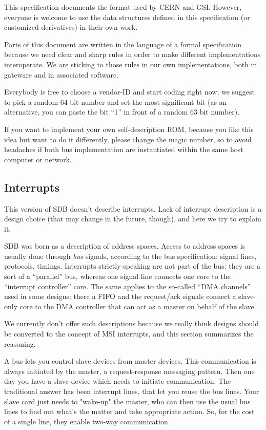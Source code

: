 \documentclass[a4paper, 12pt]{article}
\begin{document}
This specification documents the format used by CERN and GSI. However,
everyone is welcome to use the data structures defined in this
specification (or customized derivatives) in their own work.

Parts of this document are written in the language of
a formal specification because we need clear and sharp rules in
order to make different implementations interoperate.  We are sticking
to those rules in our own implementations, both in gateware and in
associated software.

Everybody is free to choose a vendor-ID and start coding right now; we
suggest to pick a random 64 bit number and set the most significant
bit (as an alternative, you can paste the bit ``1'' in front of
a random 63 bit number).

If you want to implement your own self-description ROM, because you like
this idea but want to do it differently, please change the magic number, so to avoid
headaches if both bus implementation are instantiated within the same host
computer or network.


\subsection{Interrupts}

This version of SDB doesn't describe interrupts.  Lack of interrupt
description is a design choice (that may change in the future,
though), and here we try to explain it.

SDB was born as a description of address spaces. Access to address
spaces is usually done through \textit{bus} signals, according to the
bus specification: signal lines, protocols, timings.  Interrupts
strictly-speaking are not part of the bus: they are a sort of a
``parallel'' bus, whereas one signal line connects one core to the
``interrupt controller'' core.  The same applies to the so-called
``DMA channels'' used in some designs: there a FIFO and the
request/ack signals connect a slave-only core to the DMA controller
that can act as a master on behalf of the slave.

We currently don't offer such descriptions because we really think
designs should be converted to the concept of MSI interrupts, and
this section summarizes the reasoning.


A bus lets you control slave
devices from master devices. This communication is always initiated by
the master, a request-response messaging pattern. Then one day you have
a slave device which needs to initiate communication.
The traditional answer has been interrupt lines, that
let you reuse the bus lines.  Your
slave card just needs to "wake-up" the master, who can then use the
usual bus lines to find out what's the matter and take appropriate
action. So, for the cost of a single line, they enable two-way
communication.
\end{document}
